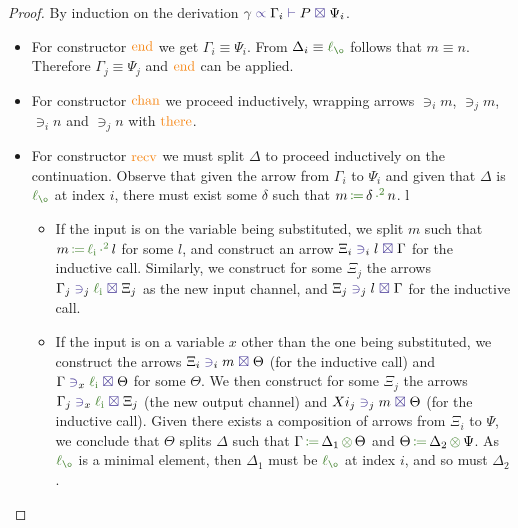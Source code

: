 \documentclass[a4paper,UKenglish,cleveref,autoref,thm-restate,authorcolumns]{lipics-v2019}
\theoremstyle{definition}
\newcommand{\type}[1]{\textcolor{BlueViolet}{\operatorname{#1}}}
\newcommand{\constr}[1]{\textcolor{BurntOrange}{\operatorname{#1}}}
\newcommand{\func}[1]{\textcolor{OliveGreen}{\operatorname{#1}}}
\newcommand{\opsquared}[3]{#1 \, \func{\coloneqq} \, #2 \, \func{\cdot^2} \, #3}
\newcommand{\opctx}[3]{#1 \, \func{\coloneqq} \, #2 \, \func{\otimes} \, #3}
\newcommand{\li}{\func{\ell_i}}
\newcommand{\lz}{\func{\ell_{\o}}}
\newcommand{\types}[4]{#1 \; \type{\propto} \; #2 \; \type{\vdash} \; #3 \; \type{\boxtimes} \; #4}
\newcommand{\containsusage}[4]{#1 \; \type{\ni}_{#2} \; #3 \; \type{\boxtimes} \; #4}
\begin{document}
\begin{proof}
  By induction on the derivation $\types{\gamma}{\Gamma_i}{P}{\Psi_i}$.
  \begin{itemize}
    \item
      For constructor $\constr{end}$ we get $\Gamma_i \equiv \Psi_i$.
      From $\Delta_i \equiv \lz$ follows that $m \equiv n$.
      Therefore $\Gamma_j \equiv \Psi_j$ and $\constr{end}$ can be applied.

    \item
      For constructor $\constr{chan}$ we proceed inductively, wrapping arrows $\ni_i m$, $\ni_j m$, $\ni_i n$ and $\ni_j n$ with $\constr{there}$.
      
    \item
      For constructor $\constr{recv}$ we must split $\Delta$ to proceed inductively on the continuation.
      Observe that given the arrow from $\Gamma_i$ to $\Psi_i$ and given that $\Delta$ is $\lz$ at index $i$, there must exist some $\delta$ such that $\opsquared{m}{\delta}{n}$.
 l     \begin{itemize}
        \item
          If the input is on the variable being substituted, we split $m$ such that $\opsquared{m}{\li}{l}$ for some $l$, and construct an arrow $\containsusage{\Xi_i}{i}{l}{\Gamma}$ for the inductive call.
          Similarly, we construct for some $\Xi_j$ the arrows $\containsusage{\Gamma_j}{j}{\li}{\Xi_j}$ as the new input channel, and $\containsusage{\Xi_j}{j}{l}{\Gamma}$ for the inductive call.
        \item
          If the input is on a variable $x$ other than the one being substituted, we construct the arrows $\containsusage{\Xi_i}{i}{m}{\Theta}$ (for the inductive call) and $\containsusage{\Gamma}{x}{\li}{\Theta}$ for some $\Theta$.
          We then construct for some $\Xi_j$ the arrows $\containsusage{\Gamma_j}{x}{\li}{\Xi_j}$ (the new output channel) and $\containsusage{Xi_j}{j}{m}{\Theta}$ (for the inductive call).
          Given there exists a composition of arrows from $\Xi_i$ to $\Psi$, we conclude that $\Theta$ splits $\Delta$ such that $\opctx{\Gamma}{\Delta_1}{\Theta}$ and $\opctx{\Theta}{\Delta_2}{\Psi}$.
          As $\lz$ is a minimal element, then $\Delta_1$ must be $\lz$ at index $i$, and so must $\Delta_2$.
      \end{itemize}


\end{itemize}
\end{proof}
\end{document}

